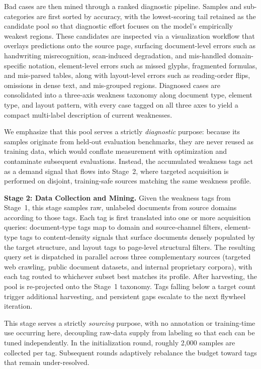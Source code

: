 Bad cases are then mined through a ranked diagnostic pipeline. Samples and sub-categories are first sorted by accuracy, with the lowest-scoring tail retained as the candidate pool so that diagnostic effort focuses on the model's empirically weakest regions. These candidates are inspected via a visualization workflow that overlays predictions onto the source page, surfacing document-level errors such as handwriting misrecognition, scan-induced degradation, and mis-handled domain-specific notation, element-level errors such as missed glyphs, fragmented formulas, and mis-parsed tables, along with layout-level errors such as reading-order flips, omissions in dense text, and mis-grouped regions. Diagnosed cases are consolidated into a three-axis weakness taxonomy along document type, element type, and layout pattern, with every case tagged on all three axes to yield a compact multi-label description of current weaknesses.

We emphasize that this pool serves a strictly \emph{diagnostic} purpose: because its samples originate from held-out evaluation benchmarks, they are never reused as training data, which would conflate measurement with optimization and contaminate subsequent evaluations. Instead, the accumulated weakness tags act as a demand signal that flows into Stage~2, where targeted acquisition is performed on disjoint, training-safe sources matching the same weakness profile.

\textbf{Stage 2: Data Collection and Mining.} Given the weakness tags from Stage~1, this stage samples raw, unlabeled documents from source domains according to those tags. Each tag is first translated into one or more acquisition queries: document-type tags map to domain and source-channel filters, element-type tags to content-density signals that surface documents densely populated by the target structure, and layout tags to page-level structural filters. The resulting query set is dispatched in parallel across three complementary sources (targeted web crawling, public document datasets, and internal proprietary corpora), with each tag routed to whichever subset best matches its profile. After harvesting, the pool is re-projected onto the Stage~1 taxonomy. Tags falling below a target count trigger additional harvesting, and persistent gaps escalate to the next flywheel iteration.

This stage serves a strictly \emph{sourcing} purpose, with no annotation or training-time use occurring here, decoupling raw-data supply from labeling so that each can be tuned independently. In the initialization round, roughly 2{,}000 samples are collected per tag. Subsequent rounds adaptively rebalance the budget toward tags that remain under-resolved.

